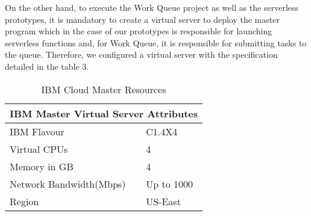 \documentclass[sigplan, screen]{acmart}
\begin{document}
\vspace{2mm}
\noindent
On the other hand, to execute the Work Queue project as well as the serverless prototypes, it is mandatory to create a virtual server to deploy the master program which in the case of our prototypes is responsible for launching serverless functions and, for Work Queue, it is responsible for submitting tasks to the queue. Therefore, we configured a virtual server with the specification detailed in the table 3.

\begin{table}[h!]
    \centering
    \begin{tabular}{ | l | p{3cm} |}
        \hline
         \multicolumn{2}{|c|}{IBM Master Virtual Server Attributes} \\
        \hline
        \hline
             IBM Flavour & C1.4X4 \\
             Virtual CPUs & 4 \\
             Memory in GB & 4 \\
             Network Bandwidth(Mbps) & Up to 1000 \\
             Region & US-East \\
        \hline
    \end{tabular}
    \caption{IBM Cloud Master Resources}
    \label{table:3}
    \vspace{-4mm}
\end{table}
\end{document}
